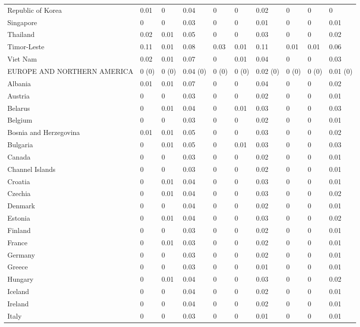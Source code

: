 \begin{longtable}[t]{llllllllll}
Republic of Korea & 0.01 & 0 & 0.04 & 0 & 0 & 0.02 & 0 & 0 & 0\\
Singapore & 0 & 0 & 0.03 & 0 & 0 & 0.01 & 0 & 0 & 0.01\\
Thailand & 0.02 & 0.01 & 0.05 & 0 & 0 & 0.03 & 0 & 0 & 0.02\\
Timor-Leste & 0.11 & 0.01 & 0.08 & 0.03 & 0.01 & 0.11 & 0.01 & 0.01 & 0.06\\
Viet Nam & 0.02 & 0.01 & 0.07 & 0 & 0.01 & 0.04 & 0 & 0 & 0.03\\
EUROPE AND NORTHERN AMERICA & 0 (0) & 0 (0) & 0.04 (0) & 0 (0) & 0 (0) & 0.02 (0) & 0 (0) & 0 (0) & 0.01 (0)\\
Albania & 0.01 & 0.01 & 0.07 & 0 & 0 & 0.04 & 0 & 0 & 0.02\\
Austria & 0 & 0 & 0.03 & 0 & 0 & 0.02 & 0 & 0 & 0.01\\
Belarus & 0 & 0.01 & 0.04 & 0 & 0.01 & 0.03 & 0 & 0 & 0.03\\
Belgium & 0 & 0 & 0.03 & 0 & 0 & 0.02 & 0 & 0 & 0.01\\
Bosnia and Herzegovina & 0.01 & 0.01 & 0.05 & 0 & 0 & 0.03 & 0 & 0 & 0.02\\
Bulgaria & 0 & 0.01 & 0.05 & 0 & 0.01 & 0.03 & 0 & 0 & 0.03\\
Canada & 0 & 0 & 0.03 & 0 & 0 & 0.02 & 0 & 0 & 0.01\\
Channel Islands & 0 & 0 & 0.03 & 0 & 0 & 0.02 & 0 & 0 & 0.01\\
Croatia & 0 & 0.01 & 0.04 & 0 & 0 & 0.03 & 0 & 0 & 0.01\\
Czechia & 0 & 0.01 & 0.04 & 0 & 0 & 0.03 & 0 & 0 & 0.02\\
Denmark & 0 & 0 & 0.04 & 0 & 0 & 0.02 & 0 & 0 & 0.01\\
Estonia & 0 & 0.01 & 0.04 & 0 & 0 & 0.03 & 0 & 0 & 0.02\\
Finland & 0 & 0 & 0.03 & 0 & 0 & 0.02 & 0 & 0 & 0.01\\
France & 0 & 0.01 & 0.03 & 0 & 0 & 0.02 & 0 & 0 & 0.01\\
Germany & 0 & 0 & 0.03 & 0 & 0 & 0.02 & 0 & 0 & 0.01\\
Greece & 0 & 0 & 0.03 & 0 & 0 & 0.01 & 0 & 0 & 0.01\\
Hungary & 0 & 0.01 & 0.04 & 0 & 0 & 0.03 & 0 & 0 & 0.02\\
Iceland & 0 & 0 & 0.04 & 0 & 0 & 0.02 & 0 & 0 & 0.01\\
Ireland & 0 & 0 & 0.04 & 0 & 0 & 0.02 & 0 & 0 & 0.01\\
Italy & 0 & 0 & 0.03 & 0 & 0 & 0.01 & 0 & 0 & 0.01\\

\end{longtable}
